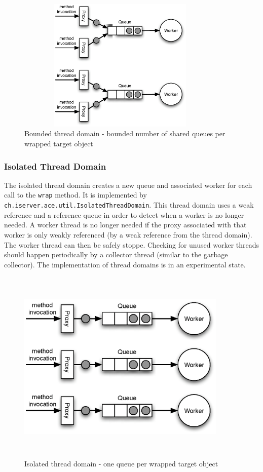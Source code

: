 \begin{figure}[H]
 \centering
 \includegraphics[width=10cm,height=6.4cm]{../images/finalreport/threaddomain_bounded.eps}
 \caption{Bounded thread domain - bounded number of shared queues per wrapped target object}
\end{figure}

\subsubsection{Isolated Thread Domain}
The isolated thread domain creates a new queue and associated worker
for each call to the \texttt{wrap} method. It is implemented by
\texttt{ch.iserver.ace.util.IsolatedThreadDomain}. This thread domain
uses a weak reference and a reference queue in order to detect when
a worker is no longer needed. A worker thread is no longer needed if the
proxy associated with that worker is only weakly referenced (by a weak
reference from the thread domain). The worker thread can then be
safely stoppe. Checking for unused worker threads should happen 
periodically by a collector thread (similar to the garbage collector). The
implementation of thread domains is in an experimental state.

\begin{figure}[H]
 \centering
 \includegraphics[width=10cm,height=9.4cm]{../images/finalreport/threaddomain_isolated.eps}
 \caption{Isolated thread domain - one queue per wrapped target object}
\end{figure}



